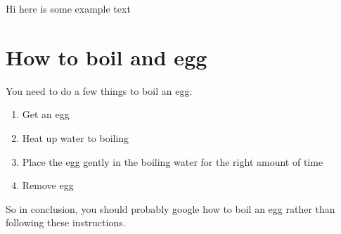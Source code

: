 
\startEntry{}
Hi here is some example text

\section{How to boil and egg}
You need to do a few things to boil an egg:
\begin{enumerate}
\item Get an egg
\item Heat up water to boiling
\item Place the egg gently in the boiling water for the right amount of time
\item Remove egg
\end{enumerate}
So in conclusion, you should probably google how to boil an egg rather than following these instructions.
\finishEntry{}
